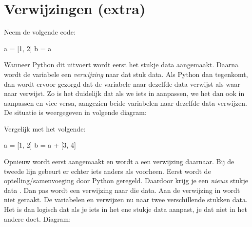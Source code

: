 \section{Verwijzingen (extra)}\label{sec:pointers}
  Neem de volgende code:
  \begin{python}
    a = [1, 2]
    b = a
  \end{python}
  Wanneer Python dit uitvoert wordt eerst het stukje data \py{[1, 2]}
  aangemaakt. Daarna wordt de variabele  een \emph{verwijzing} naar dat
  stuk data. Als Python dan  tegenkomt, dan wordt ervoor gezorgd dat
  de variabele  naar dezelfde data verwijst als waar  naar verwijst.
  Zo is het duidelijk dat als we iets in  aanpassen, we het dan ook in
   aanpassen en vice-versa, aangezien beide variabelen naar dezelfde data
  verwijzen. De situatie is weergegeven in volgende diagram:
  \begin{center}
  \end{center}

  Vergelijk met het volgende:
  \begin{python}
    a = [1, 2]
    b = a + [3, 4]
  \end{python}
  Opnieuw wordt eerst \py{[1, 2]} aangemaakt en wordt a een verwijzing daarnaar.
  Bij de tweede lijn gebeurt er echter iets anders als voorheen. Eerst wordt de
  optelling/samenvoeging door Python geregeld. Daardoor krijg je een
  \emph{nieuw} stukje data \py{[1, 2, 3, 4]}. Dan pas wordt  een
  verwijzing naar die data. Aan de verwijzing in  wordt niet geraakt. De
  variabelen  en  verwijzen nu naar twee verschillende stukken data.
  Het is dan logisch dat als je iets in het ene stukje data aanpast, je dat niet
  in het andere doet. Diagram:
  \begin{center}
  \end{center}

